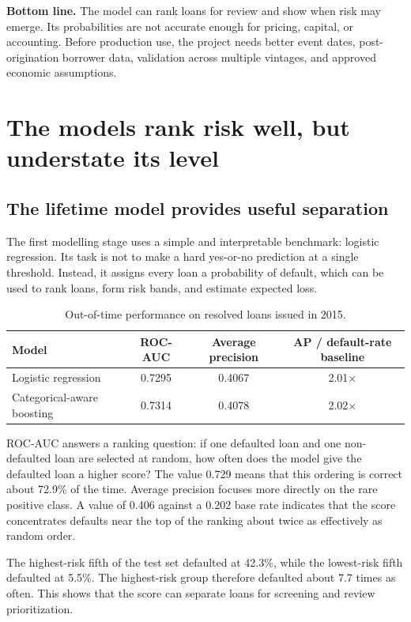 \documentclass[11pt]{article}
\begin{document}
\textbf{Bottom line.} The model can rank loans for review and show when risk may
emerge. Its probabilities are not accurate enough for pricing, capital, or
accounting. Before production use, the project needs better event dates,
post-origination borrower data, validation across multiple vintages, and approved
economic assumptions.

\tableofcontents
\newpage
{}

\section{The models rank risk well, but understate its level}

\subsection{The lifetime model provides useful separation}

The first modelling stage uses a simple and interpretable benchmark: logistic
regression. Its task is not to make a hard yes-or-no prediction at a single
threshold. Instead, it assigns every loan a probability of default, which can be
used to rank loans, form risk bands, and estimate expected loss.

\begin{table}[H]
\centering
\caption{Out-of-time performance on resolved loans issued in 2015.}
\label{tab:model-comparison}
\begin{tabular}{lccc}
\toprule
Model & ROC-AUC & Average precision & AP / default-rate baseline \\
\midrule
Logistic regression & 0.7295 & 0.4067 & 2.01$\times$ \\
Categorical-aware boosting & 0.7314 & 0.4078 & 2.02$\times$ \\
\bottomrule
\end{tabular}
\end{table}

ROC-AUC answers a ranking question: if one defaulted loan and one non-defaulted
loan are selected at random, how often does the model give the defaulted loan a
higher score? The value 0.729 means that this ordering is correct about 72.9\% of
the time. Average precision focuses more directly on the rare positive class. A
value of 0.406 against a 0.202 base rate indicates that the score concentrates
defaults near the top of the ranking about twice as effectively as random order.

The highest-risk fifth of the test set defaulted at 42.3\%, while the lowest-risk
fifth defaulted at 5.5\%. The highest-risk group therefore defaulted about 7.7
times as often. This shows that the score can separate loans for screening and
review prioritization.
\end{document}
